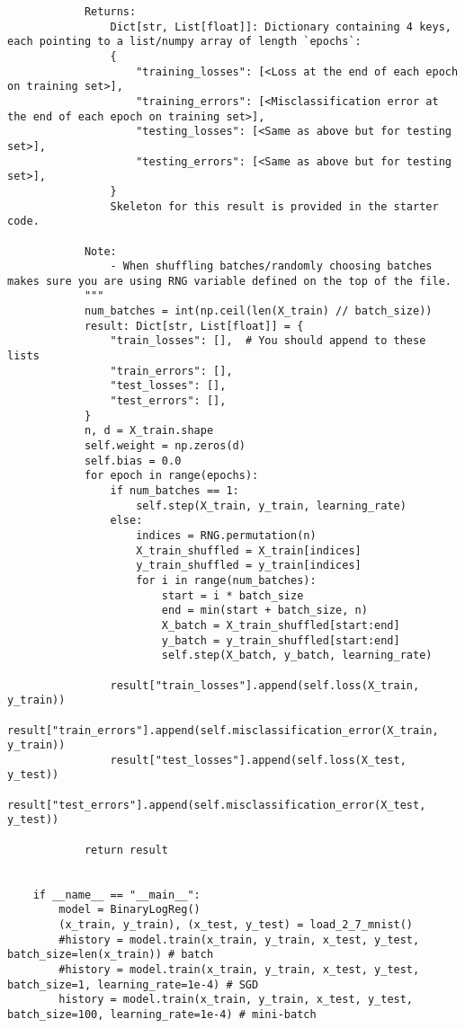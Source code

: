 \documentclass{article}
\begin{document}
\begin{lstlisting}
            Returns:
                Dict[str, List[float]]: Dictionary containing 4 keys, each pointing to a list/numpy array of length `epochs`:
                {
                    "training_losses": [<Loss at the end of each epoch on training set>],
                    "training_errors": [<Misclassification error at the end of each epoch on training set>],
                    "testing_losses": [<Same as above but for testing set>],
                    "testing_errors": [<Same as above but for testing set>],
                }
                Skeleton for this result is provided in the starter code.
    
            Note:
                - When shuffling batches/randomly choosing batches makes sure you are using RNG variable defined on the top of the file.
            """
            num_batches = int(np.ceil(len(X_train) // batch_size))
            result: Dict[str, List[float]] = {
                "train_losses": [],  # You should append to these lists
                "train_errors": [],
                "test_losses": [],
                "test_errors": [],
            }
            n, d = X_train.shape
            self.weight = np.zeros(d)
            self.bias = 0.0
            for epoch in range(epochs):
                if num_batches == 1:
                    self.step(X_train, y_train, learning_rate)
                else:
                    indices = RNG.permutation(n)
                    X_train_shuffled = X_train[indices]
                    y_train_shuffled = y_train[indices]
                    for i in range(num_batches):
                        start = i * batch_size
                        end = min(start + batch_size, n)
                        X_batch = X_train_shuffled[start:end]
                        y_batch = y_train_shuffled[start:end]
                        self.step(X_batch, y_batch, learning_rate)
    
                result["train_losses"].append(self.loss(X_train, y_train))
                result["train_errors"].append(self.misclassification_error(X_train, y_train))
                result["test_losses"].append(self.loss(X_test, y_test))
                result["test_errors"].append(self.misclassification_error(X_test, y_test))
    
            return result
    
    
    if __name__ == "__main__":
        model = BinaryLogReg()
        (x_train, y_train), (x_test, y_test) = load_2_7_mnist()
        #history = model.train(x_train, y_train, x_test, y_test, batch_size=len(x_train)) # batch
        #history = model.train(x_train, y_train, x_test, y_test, batch_size=1, learning_rate=1e-4) # SGD
        history = model.train(x_train, y_train, x_test, y_test, batch_size=100, learning_rate=1e-4) # mini-batch
    

\end{lstlisting}
\end{document}
